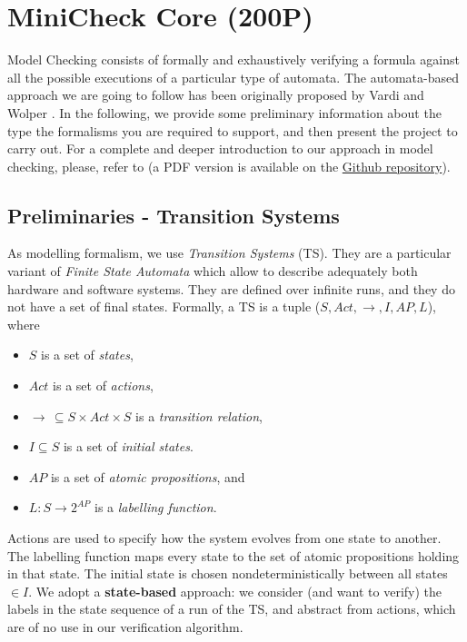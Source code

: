 \documentclass{article}
\begin{document}
\section{MiniCheck Core (200P)}

Model Checking consists of formally and exhaustively verifying a formula 
against all the possible executions of a particular type of automata. 
The automata-based approach we are going to follow has been originally proposed by 
Vardi and Wolper \cite{VarWol}.
In the following, we provide some preliminary information 
about the type the formalisms you are required to support, 
and then present the project to carry out. 
For a complete and deeper introduction to our approach in model checking, 
please, refer to \cite{BaKa} (a PDF version is available on the 
\href{https://github.com/francescopont/MiniCheck.git}{Github repository}).


\subsection{Preliminaries - Transition Systems}
\label{subsec-ts}
As modelling formalism, we use \emph{Transition Systems} (TS). They are a particular variant 
of \emph{Finite State Automata} which allow to describe adequately both hardware and software systems. 
They are defined over infinite runs, and they do not have a set of final states. 
Formally, a TS is a tuple ($S, Act, \rightarrow, I, AP, L$), where 
\begin{itemize}
    \item $S$ is a set of \emph{states},
    \item $Act$ is a set of \emph{actions},
    \item $\longrightarrow\,\subseteq S \times Act \times S$ is a \emph{transition relation},
    \item $I \subseteq S$ is a set of \emph{initial states}.
    \item $AP$ is a set of \emph{atomic propositions}, and 
    \item $L : S \rightarrow 2^{AP}$ is a \emph{labelling function}.
\end{itemize}
Actions are used to specify how the system evolves from one state to another. The labelling function 
maps every state to the set of atomic propositions holding in that state. The initial state is chosen 
nondeterministically between all states $\in I$.
We adopt a \textbf{state-based} approach: we consider (and want to verify) the labels in the state sequence 
of a run of the TS, and abstract from actions, which are of no use in our verification algorithm. 
\end{document}
